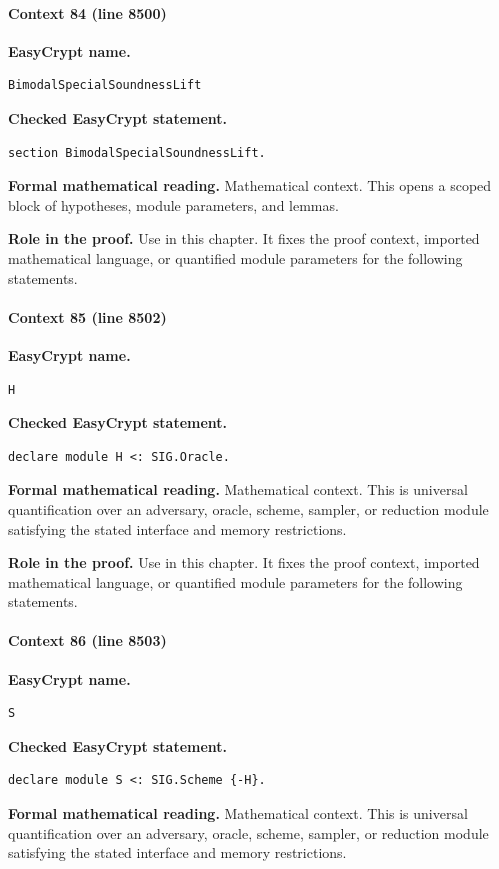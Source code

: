 \paragraph{Context 84 (line 8500)}
\noindent\textbf{EasyCrypt name.}
\begin{lstlisting}[language=EasyCrypt,basicstyle=\ttfamily\scriptsize]
BimodalSpecialSoundnessLift
\end{lstlisting}
\noindent\textbf{Checked EasyCrypt statement.}
\begin{lstlisting}[language=EasyCrypt,basicstyle=\ttfamily\scriptsize]
section BimodalSpecialSoundnessLift.
\end{lstlisting}
\noindent\textbf{Formal mathematical reading.}
Mathematical context. This opens a scoped block of hypotheses, module parameters, and lemmas.

\noindent\textbf{Role in the proof.}
Use in this chapter. It fixes the proof context, imported mathematical language, or quantified module parameters for the following statements.

\paragraph{Context 85 (line 8502)}
\noindent\textbf{EasyCrypt name.}
\begin{lstlisting}[language=EasyCrypt,basicstyle=\ttfamily\scriptsize]
H
\end{lstlisting}
\noindent\textbf{Checked EasyCrypt statement.}
\begin{lstlisting}[language=EasyCrypt,basicstyle=\ttfamily\scriptsize]
declare module H <: SIG.Oracle.
\end{lstlisting}
\noindent\textbf{Formal mathematical reading.}
Mathematical context. This is universal quantification over an adversary, oracle, scheme, sampler, or reduction module satisfying the stated interface and memory restrictions.

\noindent\textbf{Role in the proof.}
Use in this chapter. It fixes the proof context, imported mathematical language, or quantified module parameters for the following statements.

\paragraph{Context 86 (line 8503)}
\noindent\textbf{EasyCrypt name.}
\begin{lstlisting}[language=EasyCrypt,basicstyle=\ttfamily\scriptsize]
S
\end{lstlisting}
\noindent\textbf{Checked EasyCrypt statement.}
\begin{lstlisting}[language=EasyCrypt,basicstyle=\ttfamily\scriptsize]
declare module S <: SIG.Scheme {-H}.
\end{lstlisting}
\noindent\textbf{Formal mathematical reading.}
Mathematical context. This is universal quantification over an adversary, oracle, scheme, sampler, or reduction module satisfying the stated interface and memory restrictions.

